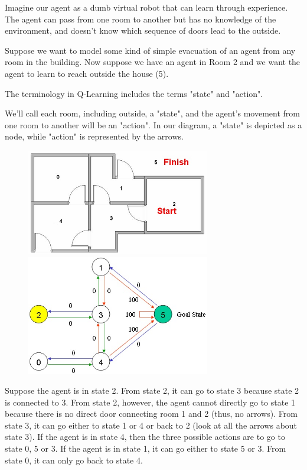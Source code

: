 \documentclass[a4paper, 11pt]{article}
\begin{document}
Imagine our agent as a dumb virtual robot that can learn through experience. The agent can pass from one room to another but has no knowledge of the environment, and doesn't know which sequence of doors lead to the outside.

Suppose we want to model some kind of simple evacuation of an agent from any room in the building. Now suppose we have an agent in Room 2 and we want the agent to learn to reach outside the house (5).

The terminology in Q-Learning includes the terms "state" and "action".

We'll call each room, including outside, a "state", and the agent's movement from one room to another will be an "action".  In our diagram, a "state" is depicted as a node, while "action" is represented by the arrows.

\begin{figure}[ht]
\centering
\includegraphics[width=8cm]{Pic/agent_clip_image002}
\quad
\includegraphics[width=8cm]{Pic/map3a}
\end{figure}

Suppose the agent is in state 2.  From state 2, it can go to state 3 because state 2 is connected to 3.  From state 2, however, the agent cannot directly go to state 1 because there is no direct door connecting room 1 and 2 (thus, no arrows).  From state 3, it can go either to state 1 or 4 or back to 2 (look at all the arrows about state 3).  If the agent is in state 4, then the three possible actions are to go to state 0, 5 or 3.  If the agent is in state 1, it can go either to state 5 or 3.  From state 0, it can only go back to state 4.
\end{document}
